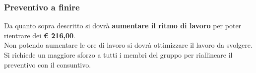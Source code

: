 		\subsubsection{Preventivo a finire} %
		\label{ssub:preventivo_a_finire}
		Da quanto sopra descritto si dovrà \textbf{aumentare il ritmo di lavoro} per poter rientrare dei \textbf{\euro{} 216,00}.\\
		Non potendo aumentare le ore di lavoro si dovrà ottimizzare il lavoro da svolgere. Si richiede un maggiore sforzo a tutti i membri del gruppo per riallineare il preventivo con il consuntivo.


